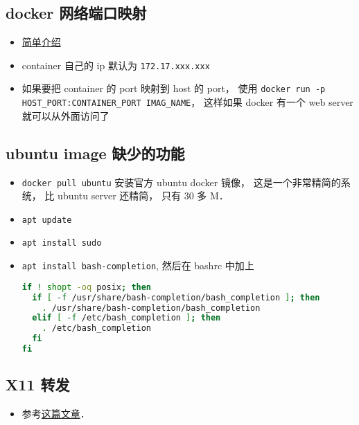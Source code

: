 \subsection{docker 网络端口映射}
\begin{itemize}
\item \href{https://www.freecodecamp.org/news/how-to-get-a-docker-container-ip-address-explained-with-examples/}{简单介绍}
\item container 自己的 ip 默认为 \verb`172.17.xxx.xxx`
\item 如果要把 container 的 port 映射到 host 的 port， 使用 \verb`docker run -p HOST_PORT:CONTAINER_PORT IMAG_NAME`， 这样如果 docker 有一个 web server 就可以从外面访问了
\end{itemize}

\subsection{ubuntu image 缺少的功能}
\begin{itemize}
\item \verb|docker pull ubuntu| 安装官方 ubuntu docker 镜像， 这是一个非常精简的系统， 比 ubuntu server 还精简， 只有 30 多 M．
\item \verb|apt update|
\item \verb`apt install sudo`
\item \verb`apt install bash-completion`, 然后在 bashrc 中加上
\begin{lstlisting}[language=bash]
if ! shopt -oq posix; then
  if [ -f /usr/share/bash-completion/bash_completion ]; then
    . /usr/share/bash-completion/bash_completion
  elif [ -f /etc/bash_completion ]; then
    . /etc/bash_completion
  fi
fi
\end{lstlisting}
\end{itemize}

\subsection{X11 转发}
\begin{itemize}
\item 参考\href{https://opendata-forum.cern.ch/t/x11-forwarding-with-docker/31}{这篇文章}．
\end{itemize}
